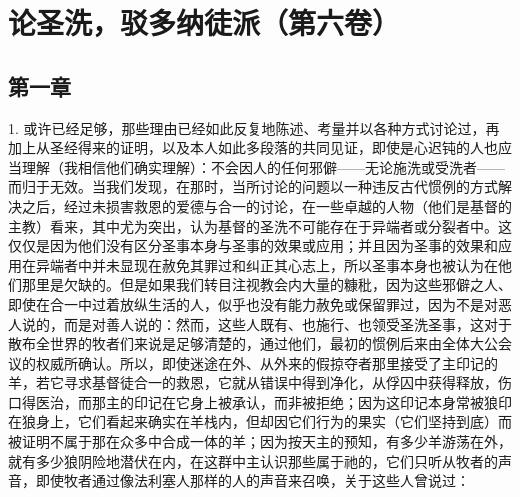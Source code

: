 
\section{论圣洗，驳多纳徒派（第六卷）}

\par


\subsection{第一章}

1. 或许已经足够，那些理由已经如此反复地陈述、考量并以各种方式讨论过，再加上从圣经得来的证明，以及本人如此多段落的共同见证，即使是心迟钝的人也应当理解（我相信他们确实理解）：不会因人的任何邪僻——无论施洗或受洗者——而归于无效。当我们发现，在那时，当所讨论的问题以一种违反古代惯例的方式解决之后，经过未损害救恩的爱德与合一的讨论，在一些卓越的人物（他们是基督的主教）看来，其中尤为突出，认为基督的圣洗不可能存在于异端者或分裂者中。这仅仅是因为他们没有区分圣事本身与圣事的效果或应用；并且因为圣事的效果和应用在异端者中并未显现在赦免其罪过和纠正其心志上，所以圣事本身也被认为在他们那里是欠缺的。但是如果我们转目注视教会内大量的糠秕，因为这些邪僻之人、即使在合一中过着放纵生活的人，似乎也没有能力赦免或保留罪过，因为不是对恶人说的，而是对善人说的：然而，这些人既有、也施行、也领受圣洗圣事，这对于散布全世界的牧者们来说是足够清楚的，通过他们，最初的惯例后来由全体大公会议的权威所确认。所以，即使迷途在外、从外来的假掠夺者那里接受了主印记的羊，若它寻求基督徒合一的救恩，它就从错误中得到净化，从俘囚中获得释放，伤口得医治，而那主的印记在它身上被承认，而非被拒绝；因为这印记本身常被狼印在狼身上，它们看起来确实在羊栈内，但却因它们行为的果实（它们坚持到底）而被证明不属于那在众多中合成一体的羊；因为按天主的预知，有多少羊游荡在外，就有多少狼阴险地潜伏在内，在这群中主认识那些属于祂的，它们只听从牧者的声音，即使牧者通过像法利塞人那样的人的声音来召唤，关于这些人曾说过：\par

